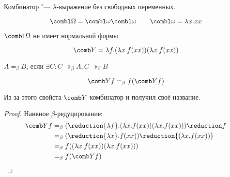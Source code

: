 \begin{definition}[комбинатор]
    Комбинатор "--- $\lambda$-выражение без свободных переменных.
\end{definition}

\begin{definition}
\[
    \combl\Omega = \combl\omega \combl\omega \qquad
    \combl\omega = \lambda x . x x
\]
\end{definition}

$\combl\Omega$ не имеет нормальной формы.

\begin{definition}
    \[
        \comb Y = \lambda f . (\lambda x . f (x x)) (\lambda x . f (x x))
    \]
\end{definition}

\begin{definition}
    $A=_{\beta}B$, если $\exists C : C \twoheadrightarrow_{\beta} A, C \twoheadrightarrow_{\beta}B$
\end{definition}

\begin{statement}
    \[
        \comb Yf =_{\beta} f(\comb Yf)
    \]
\end{statement}

Из-за этого свойста $\comb Y$-комбинатор и получил своё название.

\begin{proof} Наивное $\beta$-редуцирование:
    \begin{align*}
        \comb Yf &=_{\beta} (\reduction{\lambda f} . (\lambda x . f (x x)) (\lambda x . f (x x))) \reduction f \\
                 &=_{\beta} (\reduction{\lambda x} . f (x x)) \reduction{(\lambda x . f (x x))} \\
                 &=_{\beta} f ((\lambda x . f (x x)) (\lambda x . f (x x))) \\
                 &=_{\beta} f (\comb Y f)
    \qedhere
    \end{align*}
\end{proof}

